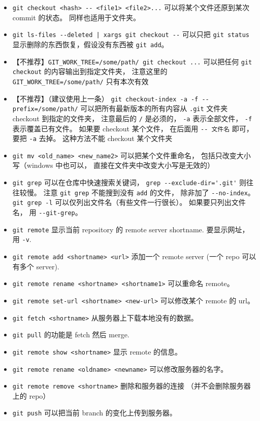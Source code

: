 \begin{itemize}
\item \verb`git checkout <hash> -- <file1> <file2>...` 可以将某个文件还原到某次 commit 的状态。 同样也适用于文件夹。
\item \verb`git ls-files --deleted | xargs git checkout --` 可以只把 \verb`git status` 显示删除的东西恢复，假设没有东西被 \verb`git add`。
\item 【不推荐】\verb`GIT_WORK_TREE=/some/path/ git checkout ...` 可以把任何 \verb`git checkout` 的内容输出到指定文件夹， 注意这里的 \verb`GIT_WORK_TREE=/some/path/` 只有本次有效
\item 【不推荐】（建议使用上一条） \verb`git checkout-index -a -f --prefix=/some/path/` 可以把所有最新版本的所有内容从 \verb`.git` 文件夹 checkout 到指定的文件夹， 注意最后的 \verb`/` 是必须的， \verb`-a` 表示全部文件， \verb`-f` 表示覆盖已有文件。 如果要 checkout 某个文件， 在后面用 \verb`-- 文件名` 即可， 要把 \verb`-a` 去掉。 这种方法不能 checkout 某个文件夹
\item \verb`git mv <old_name> <new_name2>` 可以把某个文件重命名， 包括只改变大小写（windows 中也可以， 直接在文件夹中改变大小写是无效的）
\item \verb`git grep` 可以在仓库中快速搜索关键词， \verb`grep --exclude-dir='.git'` 则往往较慢。 注意 \verb`git grep` 不能搜到没有 \verb`add` 的文件， 除非加了 \verb`--no-index`。 \verb`git grep -l` 可以仅列出文件名（有些文件一行很长）。 如果要只列出文件名， 用 \verb`--git-grep`。
\item \verb`git remote` 显示当前 repository 的 remote server shortname. 要显示网址， 用 \verb`-v`.
\item \verb`git remote add <shortname> <url>` 添加一个 remote server (一个 repo 可以有多个 server).
\item \verb`git remote rename <shortname> <shortname1>` 可以重命名 remote。
\item \verb`git remote set-url <shortname> <new-url>` 可以修改某个 remote 的 url。
\item \verb`git fetch <shortname>` 从服务器上下载本地没有的数据。
\item \verb`git pull` 的功能是 fetch 然后 merge.
\item \verb`git remote show <shortname>` 显示 remote 的信息。
\item \verb`git remote rename <oldname> <newname>` 可以修改服务器的名字。
\item \verb`git remote remove <shortname>` 删除和服务器的连接 （并不会删除服务器上的 repo）
\item \verb`git push` 可以把当前 branch 的变化上传到服务器。

\end{itemize}
